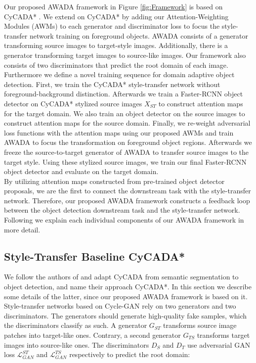 \documentclass[10pt,twocolumn,letterpaper]{article}
\begin{document}
Our proposed AWADA framework in Figure \ref{fig:Framework} is based on CyCADA* \cite{menke2022}. We extend on CyCADA* by adding our Attention-Weighting Modules (AWMs) to each generator and discriminator loss to focus the style-transfer network training on foreground objects. AWADA consists of a generator transforming source images to target-style images. Additionally, there is a generator transforming target images to source-like images. Our framework also consists of two discriminators that predict the root domain of each image. \\
Furthermore we define a novel training sequence for domain adaptive object detection. First, we train the CyCADA* style-transfer network without foreground-background distinction. Afterwards we train a Faster-RCNN \cite{FasterRCNN} object detector on CyCADA* stylized source images $X_{ST}$ to construct attention maps for the target domain. We also train an object detector on the source images to construct attention maps for the source domain. Finally, we re-weight adversarial loss functions with the attention maps using our proposed AWMs and train AWADA to focus the transformation on foreground object regions. Afterwards we freeze the source-to-target generator of AWADA to transfer source images to the target style. Using these stylized source images, we train our final Faster-RCNN object detector and evaluate on the target domain. \\
By utilizing attention maps constructed from pre-trained object detector proposals, we are the first to connect the downstream task with the style-transfer network. Therefore, our proposed AWADA framework constructs a feedback loop between the object detection downstream task and the style-transfer network. Following we explain each individual components of our AWADA framework in more detail.

\subsection{Style-Transfer Baseline CyCADA*}
We follow the authors of \cite{menke2022} and adapt CyCADA \cite{CyCADA} from semantic segmentation to object detection, and name their approach CyCADA*. In this section we describe some details of the latter, since our proposed AWADA framework is based on it.\\
Style-transfer networks based on Cycle-GAN \cite{CycleGAN} rely on two generators and two discriminators. The generators should generate high-quality fake samples, which the discriminators classify as such. A generator $G_{ST}$ transforms source image patches into target-like ones. Contrary, a second generator $G_{TS}$ transforms target images into source-like ones. The discriminators $D_S$ and $D_T$ use adversarial GAN loss $\mathcal{L}_{GAN}^{ST}$ and $\mathcal{L}_{GAN}^{TS}$ respectively to predict the root domain:
\end{document}
